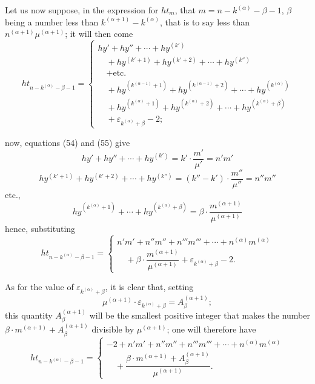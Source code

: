 \documentclass{article}
\begin{document}
Let us now suppose, in the expression for $ht_m$, that $m = n - k^{(\alpha)} - \beta - 1$, $\beta$ being a number less than $k^{(\alpha+1)} - k^{(\alpha)}$, that is to say less than $n^{(\alpha+1)}\mu^{(\alpha+1)}$; it will then come
\[ ht_{n-k^{(\alpha)}-\beta-1} = \begin{cases}
hy' + hy'' + \cdots + hy^{(k')} \\
\quad + hy^{(k'+1)} + hy^{(k'+2)} + \cdots + hy^{(k'')} \\
\quad + \text{etc.} \\
\quad + hy^{(k^{(\alpha-1)}+1)} + hy^{(k^{(\alpha-1)}+2)} + \cdots + hy^{(k^{(\alpha)})} \\
\quad + hy^{(k^{(\alpha)}+1)} + hy^{(k^{(\alpha)}+2)} + \cdots + hy^{(k^{(\alpha)}+\beta)} \\
\quad + \varepsilon_{k^{(\alpha)}+\beta} - 2;
\end{cases} \]

now, equations (54) and (55) give
\[ hy' + hy'' + \cdots + hy^{(k')} = k' \cdot \frac{m'}{\mu'} = n'm' \]
\[ hy^{(k'+1)} + hy^{(k'+2)} + \cdots + hy^{(k'')} = (k''-k') \cdot \frac{m''}{\mu''} = n''m'' \]
etc.,
\[ hy^{(k^{(\alpha)}+1)} + \cdots + hy^{(k^{(\alpha)}+\beta)} = \beta \cdot \frac{m^{(\alpha+1)}}{\mu^{(\alpha+1)}} \]
hence, substituting
\[ ht_{n-k^{(\alpha)}-\beta-1} = \begin{cases} n'm' + n''m'' + n'''m''' + \cdots + n^{(\alpha)}m^{(\alpha)} \\ \quad + \beta \cdot \dfrac{m^{(\alpha+1)}}{\mu^{(\alpha+1)}} + \varepsilon_{k^{(\alpha)}+\beta} - 2. \end{cases} \tag{56} \]

As for the value of $\varepsilon_{k^{(\alpha)}+\beta}$, it is clear that, setting
\[ \mu^{(\alpha+1)} \cdot \varepsilon_{k^{(\alpha)}+\beta} = A_\beta^{(\alpha+1)}; \]
this quantity $A_\beta^{(\alpha+1)}$ will be the smallest positive integer that makes the number $\beta \cdot m^{(\alpha+1)} + A_\beta^{(\alpha+1)}$ divisible by $\mu^{(\alpha+1)}$; one will therefore have
\[ ht_{n-k^{(\alpha)}-\beta-1} = \begin{cases} -2 + n'm' + n''m'' + n'''m''' + \cdots + n^{(\alpha)}m^{(\alpha)} \\ \quad + \dfrac{\beta \cdot m^{(\alpha+1)} + A_\beta^{(\alpha+1)}}{\mu^{(\alpha+1)}}. \end{cases} \tag{57} \]
\end{document}
